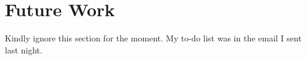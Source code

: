 \section{Future Work}

Kindly ignore this section for the moment. My to-do list was in the email I sent last night.
